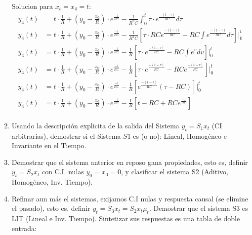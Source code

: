 \documentclass[12pt,a4paper]{report}
\begin{document}
\begin{enumerate}[label=\alph*)]
      Solucion para $x_t = x_4 = t$:
      \begin{align*}
        y_4(t) &= t \cdot \frac{1}{R} + \left(y_0 - \frac{x_0}{R}\right) \cdot e^{\frac{-t}{RC}} -
          \frac{1}{R^2C} \int_{0}^{t} \tau \cdot e^{\frac{-(t-\tau)}{RC}} d\tau\\[6pt]
        y_4(t) &= t \cdot \frac{1}{R} + \left(y_0 - \frac{x_0}{R}\right) \cdot e^{\frac{-t}{RC}} -
          \frac{1}{R^2C} \left[\tau \cdot RC e^{\frac{-(t-\tau)}{RC}} - RC\int e^{\frac{-(t-\tau)}{RC}} d\tau\right]
          \Big|_{0}^{t}\\[6pt]
        y_4(t) &= t \cdot \frac{1}{R} + \left(y_0 - \frac{x_0}{R}\right) \cdot e^{\frac{-t}{RC}} -
          \frac{1}{R} \left[\tau \cdot e^{\frac{-(t-\tau)}{RC}} - RC\int e^v dv\right] \Big|_{0}^{t}\\[6pt]
        y_4(t) &= t \cdot \frac{1}{R} + \left(y_0 - \frac{x_0}{R}\right) \cdot e^{\frac{-t}{RC}} -
          \frac{1}{R} \left[\tau \cdot e^{\frac{-(t-\tau)}{RC}} - RC e^{\frac{-(t-\tau)}{RC}} \right]
          \Big|_{0}^{t}\\[6pt]
        y_4(t) &= t \cdot \frac{1}{R} + \left(y_0 - \frac{x_0}{R}\right) \cdot e^{\frac{-t}{RC}} -
          \frac{1}{R} \left[e^{\frac{-(t-\tau)}{RC}} (\tau - RC)\right] \Big|_{0}^{t}\\[6pt]
        y_4(t) &= t \cdot \frac{1}{R} + \left(y_0 - \frac{x_0}{R}\right) \cdot e^{\frac{-t}{RC}} -
          \frac{1}{R} \left[t - RC + RC e^{\frac{-t}{RC}}\right]\\[6pt]
      \end{align*}

    \item Usando la descripción explicita de la salida del Sistema $y_t = S_1{x_t}$ (CI arbitrarias), demostrar si el
      Sistema $S1$ es (o no): Lineal, Homogéneo e Invariante en el Tiempo.

    \item Demostrar que el sistema anterior en reposo gana propiedades, esto es, definir $y_t = S_2{x_t}$ con C.I. 
      nulas $y_0 = x_0 = 0$, y clasificar el sistema S2 (Aditivo, Homogéneo, Inv. Tiempo).

    \item Refinar aun más el sistemas, exijamos C.I nulas y respuesta causal (se elimine el pasado), esto es, definir 
      $y_t = S_3{x_t} = S_2{x_t} \mu_t$. Demostrar que el sistema S3 es LIT (Lineal e Inv. Tiempo). Sintetizar sus 
      respuestas es una tabla de doble entrada:


\end{enumerate}
\end{document}

